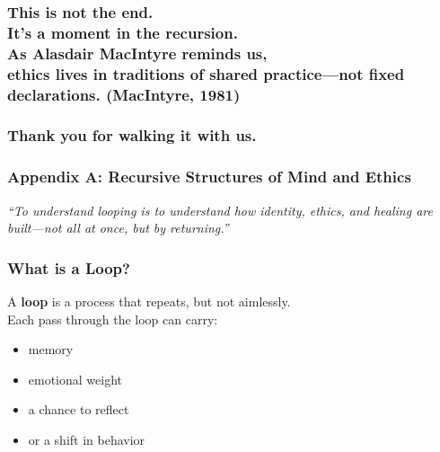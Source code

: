 \subsubsection{\texorpdfstring{This is not the end.\\
It's a moment in the recursion.\\
As Alasdair MacIntyre reminds us,\\
ethics lives in traditions of shared practice---not fixed declarations.
(MacIntyre,
1981)}{This is not the end. It's a moment in the recursion. As Alasdair MacIntyre reminds us, ethics lives in traditions of shared practice---not fixed declarations. (MacIntyre, 1981)}}\label{this-is-not-the-end.-its-a-moment-in-the-recursion.-as-alasdair-macintyre-reminds-us-ethics-lives-in-traditions-of-shared-practicenot-fixed-declarations.-macintyre-1981}

\subsubsection{Thank you for walking it with
us.}\label{thank-you-for-walking-it-with-us.}

\subsubsection{\texorpdfstring{\textbf{Appendix A: Recursive Structures of
Mind and
Ethics}}{Appendix A: Recursive Structures of Mind and Ethics}}\label{appendix-a-recursive-structures-of-mind-and-ethics}

\emph{``To understand looping is to understand how identity, ethics, and
healing are built---not all at once, but by returning.''}

\subsubsection{\texorpdfstring{\textbf{What is a Loop?}}{What is a Loop?}}\label{what-is-a-loop}

A \textbf{loop} is a process that repeats, but not aimlessly.\\
Each pass through the loop can carry:

\begin{itemize}
\item
  memory
\item
  emotional weight
\item
  a chance to reflect
\item
  or a shift in behavior
\end{itemize}

